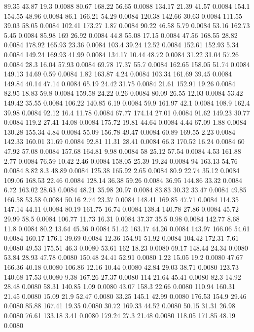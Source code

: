 89.35	43.87	19.3	0.0088
80.67	168.22	56.65	0.0088
134.17	21.39	41.57	0.0084
154.1	154.55	48.96	0.0084
86.1	166.21	54.29	0.0084
120.38	142.66	30.63	0.0084
111.55	39.03	58.05	0.0084
102.41	173.27	1.87	0.0084
90.22	46.58	5.79	0.0084
53.16	162.73	5.45	0.0084
85.98	169	26.92	0.0084
44.8	55.08	17.15	0.0084
47.56	168.55	28.82	0.0084
178.92	165.93	23.36	0.0084
103.4	39.24	12.52	0.0084
152.61	152.93	5.34	0.0084
149.24	169.93	41.99	0.0084
134.17	10.44	48.72	0.0084
31.22	31.04	57.26	0.0084
28.3	16.04	57.93	0.0084
69.78	17.37	55.7	0.0084
162.65	158.05	51.74	0.0084
149.13	14.69	0.59	0.0084
1.82	163.87	4.24	0.0084
103.34	161.69	39.45	0.0084
149.84	40.14	47.14	0.0084
65.19	24.42	31.75	0.0084
21.61	152.91	19.26	0.0084
82.95	18.83	59.8	0.0084
159.58	24.22	0.26	0.0084
80.09	26.55	12.03	0.0084
53.42	149.42	35.55	0.0084
106.22	140.85	6.19	0.0084
59.9	161.97	42.1	0.0084
108.9	162.4	39.98	0.0084
92.12	16.4	11.78	0.0084
67.77	174.14	27.01	0.0084
91.62	149.23	30.77	0.0084
119.2	27.41	14.08	0.0084
175.72	19.81	44.64	0.0084
4.44	67.09	1.88	0.0084
130.28	155.34	4.84	0.0084
55.09	156.78	49.47	0.0084
60.89	169.55	2.23	0.0084
142.33	160.01	31.69	0.0084
92.81	11.31	28.41	0.0084
66.3	170.52	16.24	0.0084
60	47.92	57.08	0.0084
157.68	164.81	9.98	0.0084
58	25.12	57.54	0.0084
4.53	161.88	2.77	0.0084
76.59	10.42	2.46	0.0084
158.05	25.39	19.24	0.0084
94	163.13	54.76	0.0084
8.82	8.3	48.89	0.0084
125.38	165.92	2.65	0.0084
80.9	22.74	35.12	0.0084
109.06	168.53	22.46	0.0084
128.14	36.38	59.26	0.0084
36.95	144.86	33.32	0.0084
6.72	163.02	28.63	0.0084
48.21	35.98	20.97	0.0084
83.83	30.32	33.47	0.0084
49.85	166.58	53.58	0.0084
50.16	2.74	23.37	0.0084
148.41	169.85	47.71	0.0084
114.35	147.14	44.11	0.0084
80.19	161.75	16.74	0.0084
138.4	140.78	27.86	0.0084
45.72	29.99	58.5	0.0084
106.77	11.73	16.31	0.0084
37.37	35.5	0.98	0.0084
142.77	8.68	11.8	0.0084
80.2	13.64	45.36	0.0084
51.42	163.17	44.26	0.0084
143.97	166.06	54.61	0.0084
160.17	176.1	39.69	0.0084
12.36	154.91	51.92	0.0084
104.42	172.31	7.61	0.0080
49.53	175.51	46.3	0.0080
53.61	162	18.23	0.0080
69.17	148.44	24.34	0.0080
53.84	28.93	47.78	0.0080
150.48	24.41	52.91	0.0080
1.22	15.05	19.2	0.0080
47.67	166.36	40.18	0.0080
106.86	12.16	10.44	0.0080
42.84	29.03	38.71	0.0080
123.73	140.68	17.53	0.0080
9.38	167.26	27.37	0.0080
114	21.64	45.41	0.0080
82.3	14.92	28.48	0.0080
58.31	140.85	1.09	0.0080
43.07	158.3	22.66	0.0080
110.94	160.31	21.45	0.0080
15.09	21.9	52.47	0.0080
33.25	145.1	42.99	0.0080
176.53	154.9	29.46	0.0080
85.88	167.41	19.35	0.0080
30.72	169.33	44.52	0.0080
50.15	31.31	26.98	0.0080
76.61	133.18	3.41	0.0080
179.24	27.3	21.48	0.0080
118.05	171.85	48.19	0.0080
